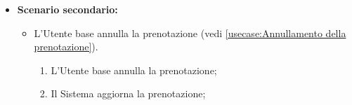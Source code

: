 \begin{itemize}
\begin{enumerate}
	      \end{enumerate}

	\item \textbf{Scenario secondario:}
	      \begin{itemize}
		      \item L'Utente base annulla la prenotazione (vedi
		            \autoref{usecase:Annullamento della prenotazione}).
		            \begin{enumerate}
			            \item L'Utente base annulla la prenotazione;
			            \item Il Sistema aggiorna la prenotazione;
		            \end{enumerate}
	      \end{itemize}
\end{itemize}

